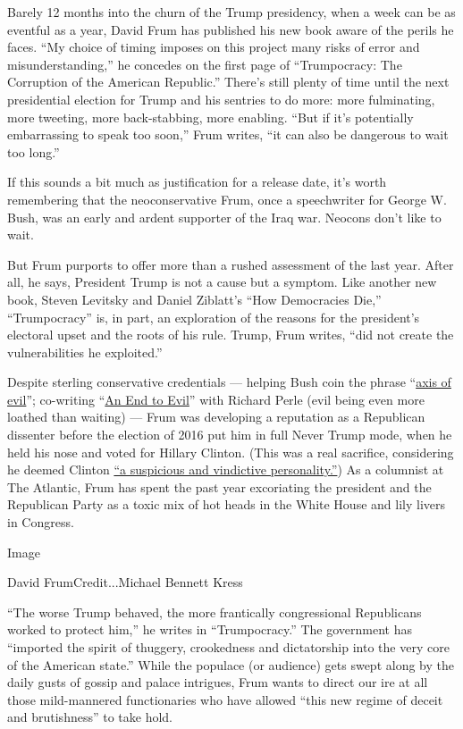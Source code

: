 Barely 12 months into the churn of the Trump presidency, when a week can
be as eventful as a year, David Frum has published his new book aware of
the perils he faces. ``My choice of timing imposes on this project many
risks of error and misunderstanding,'' he concedes on the first page of
``Trumpocracy: The Corruption of the American Republic.'' There's still
plenty of time until the next presidential election for Trump and his
sentries to do more: more fulminating, more tweeting, more
back-stabbing, more enabling. ``But if it's potentially embarrassing to
speak too soon,'' Frum writes, ``it can also be dangerous to wait too
long.''

If this sounds a bit much as justification for a release date, it's
worth remembering that the neoconservative Frum, once a speechwriter for
George W. Bush, was an early and ardent supporter of the Iraq war.
Neocons don't like to wait.

But Frum purports to offer more than a rushed assessment of the last
year. After all, he says, President Trump is not a cause but a symptom.
Like another new book, Steven Levitsky and Daniel Ziblatt's ``How
Democracies Die,'' ``Trumpocracy'' is, in part, an exploration of the
reasons for the president's electoral upset and the roots of his rule.
Trump, Frum writes, ``did not create the vulnerabilities he exploited.''

Despite sterling conservative credentials --- helping Bush coin the
phrase
``\href{http://www.nytimes.com/2003/01/20/us/white-house-letter-axis-of-evil-first-birthday-for-a-famous-phrase.html}{axis
of evil}''; co-writing
``\href{http://www.nytimes.com/2004/02/08/books/showing-them-who-s-boss.html}{An
End to Evil}'' with Richard Perle (evil being even more loathed than
waiting) --- Frum was developing a reputation as a Republican dissenter
before the election of 2016 put him in full Never Trump mode, when he
held his nose and voted for Hillary Clinton. (This was a real sacrifice,
considering he deemed Clinton
\href{https://www.theatlantic.com/politics/archive/2016/11/dont-gamble-on-trump/506207/}{``a
suspicious and vindictive personality.''}) As a columnist at The
Atlantic, Frum has spent the past year excoriating the president and the
Republican Party as a toxic mix of hot heads in the White House and lily
livers in Congress.

Image

David FrumCredit...Michael Bennett Kress

``The worse Trump behaved, the more frantically congressional
Republicans worked to protect him,'' he writes in ``Trumpocracy.'' The
government has ``imported the spirit of thuggery, crookedness and
dictatorship into the very core of the American state.'' While the
populace (or audience) gets swept along by the daily gusts of gossip and
palace intrigues, Frum wants to direct our ire at all those
mild-mannered functionaries who have allowed ``this new regime of deceit
and brutishness'' to take hold.

